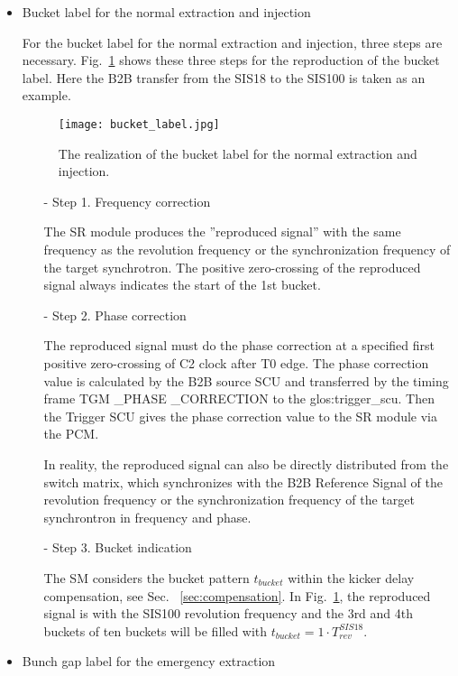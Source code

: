 \begin{itemize}
\item Bucket label for the normal extraction and injection

For the bucket label for the normal extraction and injection, three steps are necessary. Fig.~\ref{bucket_label} shows these three steps for the reproduction of the bucket label. Here the B2B transfer from the SIS18 to the SIS100 is taken as an example.
\begin{figure}[!htb]
   \centering   
   \texttt{[image: bucket\_label.jpg]}
   \caption{The realization of the bucket label for the normal extraction and injection.}
   \label{bucket_label}
\end{figure}  
\begin{itemize}
\item[-] Step 1. Frequency correction

The \gls{SR} module produces the ''reproduced signal'' with the same frequency as the revolution frequency or the synchronization frequency of the target synchrotron. The positive zero-crossing of the reproduced signal always indicates the start of the 1st bucket.
\item[-] Step 2. Phase correction

The reproduced signal must do the phase correction at a specified first positive zero-crossing of C2 clock after T0 edge. The phase correction value is calculated by the B2B source SCU and transferred by the timing frame TGM \_PHASE \_CORRECTION to the \gls{glos:trigger_scu}. Then the Trigger SCU gives the phase correction value to the SR module via the PCM.

In reality, the reproduced signal can also be directly distributed from the switch matrix, which synchronizes with the B2B Reference Signal of the revolution frequency or the synchronization frequency of the target synchrontron in frequency and phase.

\item[-] Step 3. Bucket indication

The SM considers the bucket pattern $t_{\mathit{bucket}}$ within the kicker delay compensation, see Sec. ~\ref{sec:compensation}. In Fig.~\ref{bucket_label}, the reproduced signal is with the SIS100 revolution frequency and the 3rd and 4th buckets of ten buckets will be filled with $t_{\mathit{bucket}}=1\cdot T_{\mathit{rev}}^{\mathit{SIS18}}$. 
\end{itemize}

\item Bunch gap label for the emergency extraction


\end{itemize}
